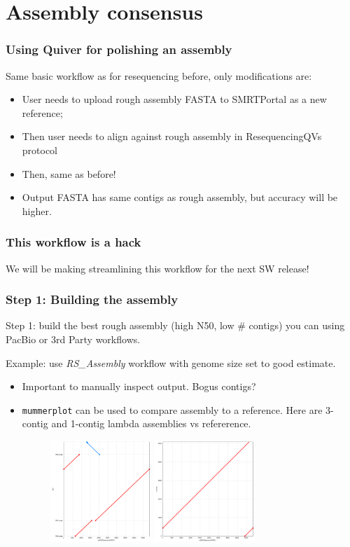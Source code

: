 \documentclass[11pt,serif]{beamer}
\begin{document}
\section{Assembly consensus}
\label{sec-3}
\begin{frame}[fragile]\frametitle{Using Quiver for polishing an assembly}
\label{sec-3-1}

   Same basic workflow as for resequencing before, only modifications are:
\begin{itemize}
\item User needs to upload rough assembly FASTA to SMRTPortal as a
       new reference;
\item Then user needs to align against rough assembly in ResequencingQVs protocol
\item Then, same as before!
\item Output FASTA has same contigs as rough assembly, but accuracy
       will be higher.
\end{itemize}
\end{frame}
\begin{frame}[fragile]\frametitle{This workflow is a hack}
\label{sec-3-2}

   We will be making streamlining this workflow for the next SW release!
\end{frame}
\begin{frame}[fragile]\frametitle{Step 1: Building the assembly}
\label{sec-3-3}

Step 1: build the best rough assembly (high N50, low \# contigs) you
can using PacBio or 3rd Party workflows. \newline

Example: use \emph{RS\_Assembly} workflow with genome size set to good
estimate.

\begin{itemize}
\item Important to manually inspect output.  Bogus contigs?
\item \verb~mummerplot~ can be used to compare assembly to a reference.  Here
  are 3-contig and 1-contig lambda assemblies vs refererence.

   \begin{figure}
   \centering
     \includegraphics[width=1.5in]{img/lambda-3contig-assembly.png}
     \includegraphics[width=1.5in]{img/lambda-1contig-assembly.png}
   \end{figure}
\end{itemize}
\end{frame}
\end{document}
